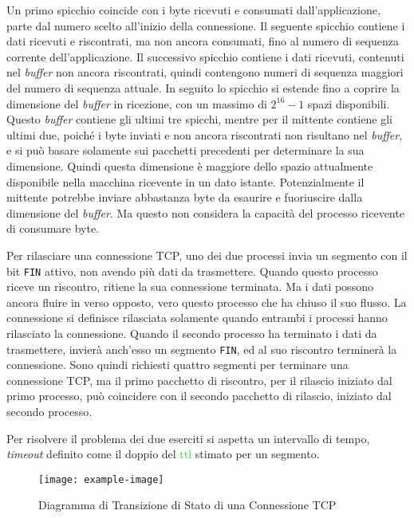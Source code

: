 \documentclass{article}
\numberwithin{equation}{subsection}
\begin{document}
Un primo spicchio coincide con i byte ricevuti e consumati dall'applicazione, parte dal numero scelto all'inizio della connessione. Il seguente spicchio contiene i dati ricevuti e riscontrati, ma non ancora consumati, fino al numero di sequenza corrente dell'applicazione. Il successivo spicchio contiene i dati ricevuti, contenuti nel \textit{buffer} non ancora riscontrati, quindi contengono numeri di sequenza maggiori del numero di sequenza attuale. In seguito lo spicchio si estende fino a coprire la dimensione del \textit{buffer} in ricezione, con un massimo di $2^{16}-1$ spazi disponibili. 
Questo \textit{buffer} contiene gli ultimi tre spicchi, mentre per il mittente contiene gli ultimi due, poiché i byte inviati e non ancora riscontrati non risultano nel \textit{buffer}, e si può basare solamente sui pacchetti precedenti per determinare la sua dimensione. Quindi questa dimensione è maggiore dello spazio attualmente disponibile nella macchina ricevente in un dato istante. Potenzialmente il mittente potrebbe inviare abbastanza byte da esaurire e fuoriuscire dalla dimensione del \textit{buffer}. Ma questo non considera la capacità del processo ricevente di consumare byte. 

Per rilasciare una connessione \textcolor{Bittersweet}{TCP}, uno dei due processi invia un segmento con il bit \verb|FIN| attivo, non avendo più dati da trasmettere. Quando questo processo riceve un riscontro, ritiene la sua connessione terminata. 
Ma i dati possono ancora fluire in verso opposto, vero questo processo che ha chiuso il suo flusso. La connessione si definisce rilasciata solamente quando entrambi i processi hanno rilasciato la connessione. Quando il secondo processo ha terminato i dati da trasmettere, invierà anch'esso un segmento \verb|FIN|, ed al suo riscontro terminerà la connessione. 
Sono quindi richiesti quattro segmenti per terminare una connessione \textcolor{Bittersweet}{TCP}, ma il primo pacchetto di riscontro, per il rilascio iniziato dal primo processo, può coincidere con il secondo pacchetto di rilascio, iniziato dal secondo processo. 

Per risolvere il problema dei due eserciti si aspetta un intervallo di tempo, \textit{timeout} definito come il doppio del \textcolor{LimeGreen}{ttl} stimato per un segmento. 

\begin{figure}[H]%
    \centering%
    \texttt{[image: example-image]}%
    \caption{Diagramma di Transizione di Stato di una Connessione \textcolor{Bittersweet}{TCP}}%
\end{figure}
\end{document}
